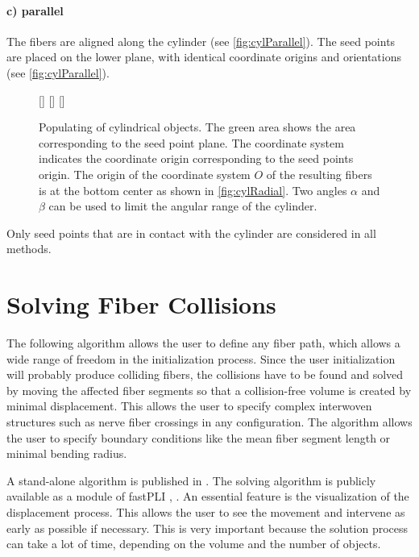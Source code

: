 \paragraph{c) parallel}
The fibers are aligned along the cylinder (see \cref{fig:cylParallel}).
The seed points are placed on the lower plane, with identical coordinate origins and orientations (see \cref{fig:cylParallel}).
%
\begin{figure}[!t]
    \centering
    \setlength{\tikzwidth}{0.3\textwidth}
    \captionsetup[subfigure]{skip=-10pt}
    [\tikzwidth]{%
    }\hfill
    [\tikzwidth]{%
    }\hfill
    [\tikzwidth]{%
    }
	\caption[]{Populating of cylindrical objects.
    The green area shows the area corresponding to the seed point plane.
    The coordinate system indicates the coordinate origin corresponding to the seed points origin.
    The origin of the coordinate system $O$ of the resulting fibers is at the bottom center as shown in \cref{fig:cylRadial}.
    Two angles $\alpha$ and $\beta$ can be used to limit the angular range of the cylinder.}
\end{figure}
%
\par
Only seed points that are in contact with the cylinder are considered in all methods.
%
%
\section{Solving Fiber Collisions}
\label{sec:Solver}
%
The following algorithm allows the user to define any fiber path, which allows a wide range of freedom in the initialization process.
Since the user initialization will probably produce colliding fibers, the collisions have to be found and solved by moving the affected fiber segments so that a collision-free volume is created by minimal displacement.
This allows the user to specify complex interwoven structures such as nerve fiber crossings in any configuration.
The algorithm allows the user to specify boundary conditions like the mean fiber segment length or minimal bending radius.
\par
% 
A stand-alone algorithm is published in \cite{Matuschke2019}.
The solving algorithm is publicly available as a module of \ac{fastPLI} \cite{Matuschke2021}, .
An essential feature is the visualization of the displacement process.
This allows the user to see the movement and intervene as early as possible if necessary.
This is very important because the solution process can take a lot of time, depending on the volume and the number of objects.
%
%
% 
